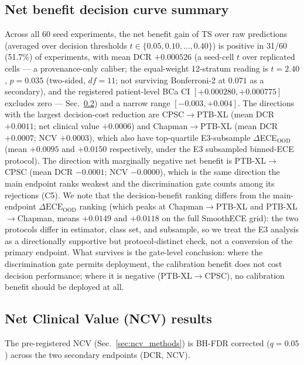 \documentclass[final,5p,times,nonatbib]{elsarticle}
\begin{document}
\subsection{Net benefit decision curve summary}
\label{sec:net_benefit_summary}
Across all 60 seed experiments, the net benefit gain of TS over raw
predictions (averaged over decision thresholds $t \in \{0.05, 0.10,
\ldots, 0.40\}$) is positive in 31/60 (51.7\%) of experiments, with
mean DCR $+0.000526$ (a seed-cell $t$ over replicated cells --- a
provenance-only caliber; the equal-weight 12-stratum reading is
$t=2.40$, $p=0.035$ (two-sided, $df=11$; not surviving
Bonferroni-2 at $0.071$ as a secondary), and the registered
patient-level BCa CI $[+0.000280, +0.000775]$ excludes zero ---
Sec.~\ref{sec:ncv_results}) and a narrow range
$[-0.003, +0.004]$. The directions with
the largest decision-cost reduction are CPSC$\rightarrow$PTB-XL
(mean DCR $+0.0011$; net clinical value $+0.0006$) and
Chapman$\rightarrow$PTB-XL (mean DCR $+0.0007$; NCV $+0.0003$), which
also have top-quartile E3-subsample $\Delta$ECE$_{\text{OOD}}$ (mean
$+0.0095$ and $+0.0150$ respectively, under the E3 subsampled
binned-ECE protocol). The direction
with marginally negative net benefit is PTB-XL$\rightarrow$CPSC (mean
DCR $-0.0001$; NCV $-0.0000$), which is the same direction the main
endpoint ranks weakest and the discrimination gate counts among its
rejections (C5). We note that the decision-benefit ranking
differs from the main-endpoint $\Delta\text{ECE}_{\text{OOD}}$ ranking
(which peaks at Chapman$\rightarrow$PTB-XL and PTB-XL$\rightarrow$Chapman,
means $+0.0149$ and $+0.0118$ on the full SmoothECE grid): the two
protocols differ in estimator, class set, and subsample, so we treat
the E3 analysis as a directionally supportive but protocol-distinct
check, not a conversion of the primary endpoint. What survives is the
gate-level conclusion: where the discrimination gate permits
deployment, the calibration benefit does not cost decision
performance; where it is negative (PTB-XL$\rightarrow$CPSC), no
calibration benefit should be deployed at all.

\subsection{Net Clinical Value (NCV) results}
\label{sec:ncv_results}
The pre-registered NCV (Sec.~\ref{sec:ncv_methods}) is BH-FDR corrected
($q=0.05$) across the two secondary endpoints (DCR, NCV).
\end{document}
